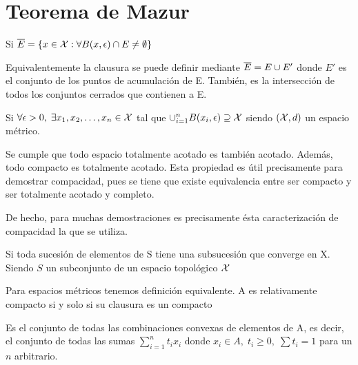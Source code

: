 \section{Teorema de Mazur}

\begin{dfn}[Clausura,$\ov{E}$] Si $\overline{E}=\{x\in\mathcal{X}:\forall B(x,\epsilon)\cap E\neq\emptyset\}$
\end{dfn}

\begin{obs} Equivalentemente la clausura se puede definir mediante $\overline{E}=E\cup E'$ donde $E'$ es el conjunto de los puntos de acumulaci\'on de E. Tambi\'en, es la intersecci\'on de todos los conjuntos cerrados que contienen a E.
\end{obs}

\begin{dfn}  Si  $\forall \epsilon>0,\; \exists x_1,x_2,\ldots,x_n \in \mathcal{X}$ tal que
$\cup^n_{i=1}{B(x_i,\epsilon)}\supseteq\mathcal{X}$ siendo $(\mathcal{X},d)$ un espacio m\'etrico.
\end{dfn}

\begin{obs} Se cumple que todo espacio totalmente acotado es tambi\'en acotado. Adem\'as, todo compacto es totalmente acotado.
Esta propiedad es \'util precisamente para demostrar compacidad, pues se tiene que existe equivalencia entre ser compacto
y ser totalmente acotado y completo.
\end{obs}

De hecho, para muchas demostraciones es precisamente \'esta caracterizaci\'on de compacidad la que se utiliza.

\begin{dfn} Si toda sucesi\'on de elementos de S tiene una subsucesi\'on que converge en X.
 Siendo $S$ un subconjunto de un espacio topol\'ogico $\mathcal{X}$
\end{dfn}

\begin{obs} Para espacios métricos tenemos definici\'on equivalente. A es relativamente compacto si y solo si su clausura es un compacto
\end{obs}

\begin{dfn} Es el conjunto de todas las combinaciones convexas de elementos de A, es decir, el conjunto de todas las sumas
$\sum^n_{i=1}{t_ix_i}$ donde $x_i\in A,\; t_i\geq 0,\; \sum{t_i}=1$ para un $n$ arbitrario.
\end{dfn}

